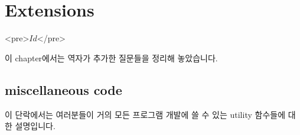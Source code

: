 \chapter{Extensions}	\label{chap:ext}

\begin{rawhtml}
<pre>$Id$</pre>
\end{rawhtml}

이 chapter에서는 역자가 추가한 질문들을 정리해 놓았습니다.

\section{miscellaneous code}	\label{sec:misccode}
이 단락에서는 여러분들이 거의 모든 프로그램 개발에 쓸 수 있는 utility
함수들에 대한 설명입니다.

